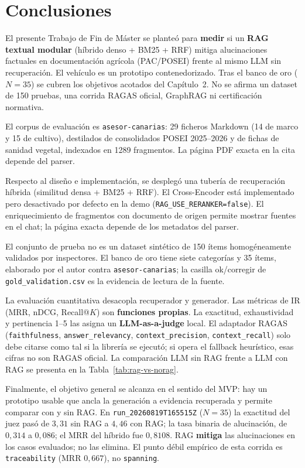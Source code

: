 \chapter{Conclusiones}

El presente Trabajo de Fin de Máster se planteó para \textbf{medir} si un \textbf{RAG textual modular} (híbrido denso + BM25 + RRF) mitiga alucinaciones factuales en documentación agrícola (PAC/POSEI) frente al mismo LLM sin recuperación. El vehículo es un prototipo contenedorizado. Tras el banco de oro ($N=35$) se cubren los objetivos acotados del Capítulo~2. No se afirma un dataset de 150 pruebas, una corrida RAGAS oficial, GraphRAG ni certificación normativa.

El corpus de evaluación es \texttt{asesor-canarias}: 29 ficheros Markdown (14 de marco y 15 de cultivo), destilados de consolidados POSEI 2025--2026 y de fichas de sanidad vegetal, indexados en 1289 fragmentos. La página PDF exacta en la cita depende del parser.

Respecto al diseño e implementación, se desplegó una tubería de recuperación híbrida (similitud densa + BM25 + RRF). El Cross-Encoder está implementado pero desactivado por defecto en la demo (\texttt{RAG\_USE\_RERANKER=false}). El enriquecimiento de fragmentos con documento de origen permite mostrar fuentes en el chat; la página exacta depende de los metadatos del parser.

El conjunto de prueba no es un dataset sintético de 150 ítems homogéneamente validados por inspectores. El banco de oro tiene siete categorías y 35 ítems, elaborado por el autor contra \texttt{asesor-canarias}; la casilla ok/corregir de \texttt{gold\_validation.csv} es la evidencia de lectura de la fuente.

La evaluación cuantitativa desacopla recuperador y generador. Las métricas de IR (MRR, nDCG, Recall@$K$) son \textbf{funciones propias}. La exactitud, exhaustividad y pertinencia 1--5 las asigna un \textbf{LLM-as-a-judge} local. El adaptador RAGAS (\texttt{faithfulness}, \texttt{answer\_relevancy}, \texttt{context\_precision}, \texttt{context\_recall}) solo debe citarse como tal si la librería se ejecutó; si opera el fallback heurístico, esas cifras no son RAGAS oficial. La comparación LLM sin RAG frente a LLM con RAG se presenta en la Tabla~\ref{tab:rag-vs-norag}.

Finalmente, el objetivo general se alcanza en el sentido del MVP: hay un prototipo usable que ancla la generación a evidencia recuperada y permite comparar con y sin RAG. En \texttt{run\_20260819T165515Z} ($N=35$) la exactitud del juez pasó de $3{,}31$ sin RAG a $4{,}46$ con RAG; la tasa binaria de alucinación, de $0{,}314$ a $0{,}086$; el MRR del híbrido fue $0{,}8108$. RAG \textbf{mitiga} las alucinaciones en los casos evaluados; no las elimina. El punto débil empírico de esta corrida es \texttt{traceability} (MRR $0{,}667$), no \texttt{spanning}.

